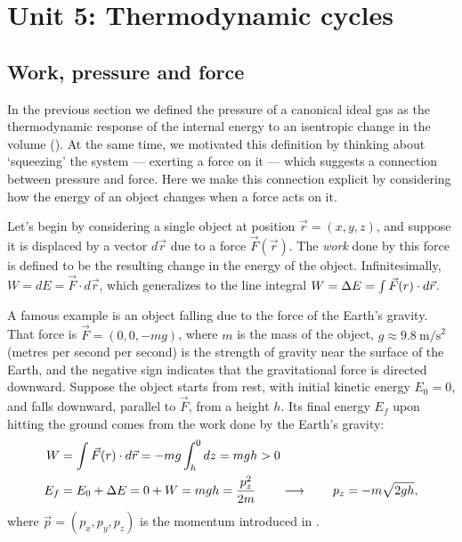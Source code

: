 \renewcommand{\thisunit}{MATH327 Unit 5}
\renewcommand{\moddate}{Last modified 6 Mar.~2023}
\setcounter{section}{5}
\setcounter{subsection}{0}
{}
\section*{Unit 5: Thermodynamic cycles}
\subsection{\label{sec:work}Work, pressure and force}
In the previous section we defined the pressure of a canonical ideal gas as the thermodynamic response of the internal energy to an isentropic change in the volume ().
At the same time, we motivated this definition by thinking about `squeezing' the system --- exerting a force on it --- which suggests a connection between pressure and force.
Here we make this connection explicit by considering how the energy of an object changes when a force acts on it.

Let's begin by considering a single object at position $\vec r = (x, y, z)$, and suppose it is displaced by a vector $d\vec r$ due to a force $\vec F(\vec r)$.
The \emph{work} done by this force is defined to be the resulting change in the energy of the object.
Infinitesimally, $W = dE = \vec F\cdot d\vec r$, which generalizes to the line integral $W = \Delta E = \int \vec F(r)\cdot d\vec r$.

A famous example is an object falling due to the force of the Earth's gravity.
That force is $\vec F = (0, 0, -mg)$, where $m$ is the mass of the object, $g \approx 9.8~\mathrm{m}/\mathrm{s}^2$ (metres per second per second) is the strength of gravity near the surface of the Earth, and the negative sign indicates that the gravitational force is directed downward.
Suppose the object starts from rest, with initial kinetic energy $E_0 = 0$, and falls downward, parallel to $\vec F$, from a height $h$.
Its final energy $E_f$ upon hitting the ground comes from the work done by the Earth's gravity:
\begin{align*}
  W & = \int \vec F(r)\cdot d\vec r = -mg \int_h^0 dz = mgh > 0 \\
  E_f & = E_0 + \Delta E = 0 + W = mgh = \frac{p_z^2}{2m} \qquad \longrightarrow \qquad p_z = -m\sqrt{2gh},
\end{align*}
where $\vec p = (p_x, p_y, p_z)$ is the momentum introduced in .

